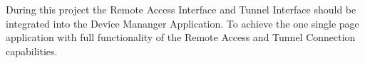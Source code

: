 During this project the Remote Access Interface and Tunnel Interface should be integrated into the Device Mananger Application.
To achieve the one single page application with full functionality of the Remote Access and Tunnel Connection capabilities.
